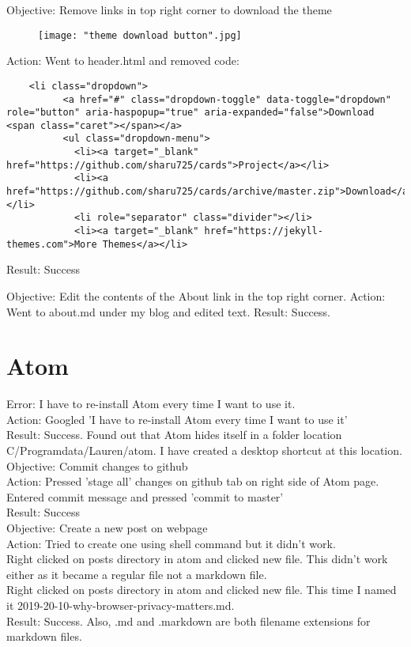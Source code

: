 \documentclass{article}
\begin{document}
Objective: Remove links in top right corner to download the theme\\
\begin{figure}[htp]
    \centering
    \texttt{[image: "theme download button".jpg]}
\end{figure}
\newline
Action: Went to header.html and removed code:
\begin{verbatim}
    <li class="dropdown">
          <a href="#" class="dropdown-toggle" data-toggle="dropdown" role="button" aria-haspopup="true" aria-expanded="false">Download <span class="caret"></span></a>
          <ul class="dropdown-menu">
            <li><a target="_blank" href="https://github.com/sharu725/cards">Project</a></li>
            <li><a href="https://github.com/sharu725/cards/archive/master.zip">Download</a></li>
            <li role="separator" class="divider"></li>
            <li><a target="_blank" href="https://jekyll-themes.com">More Themes</a></li>
\end{verbatim}
Result: Success

Objective: Edit the contents of the About link in the top right corner.
Action: Went to about.md under my blog and edited text.
Result: Success.

\section{Atom}
Error: I have to re-install Atom every time I want to use it.\\
Action: Googled 'I have to re-install Atom every time I want to use it'\\
Result: Success. Found out that Atom hides itself in a folder location C/Programdata/Lauren/atom. I have created a desktop shortcut at this location. \\

Objective: Commit changes to github\\
Action: Pressed 'stage all' changes on github tab on right side of Atom page.\\
Entered commit message and pressed 'commit to master'\\
Result: Success\\

Objective: Create a new post on webpage\\
Action: Tried to create one using shell command but it didn't work. \\
Right clicked on posts directory in atom and clicked new file. This didn't work either as it became a regular file not a markdown file.\\
Right clicked on posts directory in atom and clicked new file. This time I named it 2019-20-10-why-browser-privacy-matters.md.\\
Result: Success. Also, .md and .markdown are both filename extensions for markdown files.\\
\end{document}
